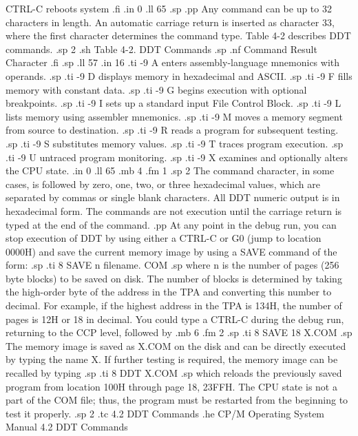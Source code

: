 CTRL-C      reboots system 
.fi
.in 0
.ll 65
.sp 
.pp
Any command can be up to 32 characters in length.  An automatic 
carriage return is inserted as character 33, where the 
first character determines the command type.  Table 4-2 describes DDT 
commands.
.sp 2
.sh
                    Table 4-2.  DDT Commands
.sp
.nf
    Command                    Result
   Character
.fi
.sp
.ll 57
.in 16
.ti -9
A        enters assembly-language mnemonics with operands.
.sp
.ti -9
D        displays memory in hexadecimal and ASCII.
.sp
.ti -9
F        fills memory with constant data.
.sp
.ti -9
G        begins execution with optional breakpoints.
.sp
.ti -9
I        sets up a standard input File Control Block.
.sp
.ti -9
L        lists memory using assembler mnemonics.
.sp
.ti -9
M        moves a memory segment from source to destination.
.sp
.ti -9
R        reads a program for subsequent testing.
.sp
.ti -9
S        substitutes memory values.
.sp
.ti -9
T        traces program execution.
.sp
.ti -9
U        untraced program monitoring.
.sp
.ti -9
X        examines and optionally alters the CPU state.
.in 0
.ll 65
.mb 4
.fm 1
.sp 2
The command character, in some cases, is followed by zero, one, 
two, or three hexadecimal values, which are separated by commas 
or single blank characters.  All DDT numeric output is in 
hexadecimal form.  The commands are not execution until the 
carriage return is typed at the end of the command.
.pp
At any point in the debug run, you can stop execution of 
DDT by using either a CTRL-C or G0 (jump to location 0000H) and 
save the current memory image by using a SAVE command of the form:
.sp
.ti 8
SAVE n filename. COM
.sp
where n is the number of pages (256 byte blocks) to be saved on 
disk.  The number of blocks is determined by taking the high-order 
byte of the address in the TPA and converting this number to 
decimal.  For example, if the highest address in the TPA is 134H, 
the number of pages is 12H or 18 in decimal.  You could type a 
CTRL-C during the debug run, returning to the CCP level, followed 
by
.mb 6
.fm 2
.sp
.ti 8
SAVE 18 X.COM
.sp
The memory image is saved as X.COM on the disk and can be 
directly executed by typing the name X.  If further testing is 
required, the memory image can be recalled by typing
.sp
.ti 8
DDT X.COM
.sp
which reloads the previously saved program from location 100H 
through page 18, 23FFH.  The CPU state is not a part of the COM 
file; thus, the program must be restarted from the beginning to 
test it properly.
.sp 2
.tc    4.2  DDT Commands
.he CP/M Operating System Manual                    4.2  DDT Commands
